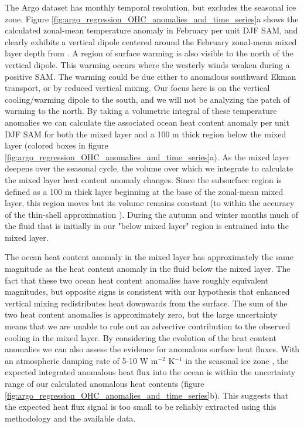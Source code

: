 \documentclass{ametsocV5}
\begin{document}
The Argo dataset has monthly temporal resolution, but excludes the seasonal ice zone. Figure \ref{fig:argo_regression_OHC_anomalies_and_time_series}a shows the calculated zonal-mean temperature anomaly in February per unit DJF SAM, and clearly exhibits a vertical dipole centered around the February zonal-mean mixed layer depth from \citet{Holte2017}. A region of surface warming is also visible to the north of the vertical dipole. This warming occurs where the westerly winds weaken during a positive SAM. The warming could be due either to anomalous southward Ekman transport, or by reduced vertical mixing. Our focus here is on the vertical cooling/warming dipole to the south, and we will not be analyzing the patch of warming to the north. By taking a volumetric integral of these temperature anomalies we can calculate the associated ocean heat content anomaly per unit DJF SAM for both the mixed layer and a 100 m thick region below the mixed layer (colored boxes in figure \ref{fig:argo_regression_OHC_anomalies_and_time_series}a). As the mixed layer deepens over the seasonal cycle, the volume over which we integrate to calculate the mixed layer heat content anomaly changes. Since the subsurface region is defined as a 100 m thick layer beginning at the base of the zonal-mean mixed layer, this region  moves but its volume remains constant (to within the accuracy of the thin-shell approximation \citep{Vallis2006}). During the autumn and winter months much of the fluid that is initially in our "below mixed layer" region is entrained into the mixed layer.


The ocean heat content anomaly in the mixed layer has approximately the same magnitude as the heat content anomaly in the fluid below the mixed layer. The fact that these two ocean heat content anomalies have roughly equivalent magnitudes, but opposite signs is consistent with our hypothesis that enhanced vertical mixing redistributes heat downwards from the surface. The sum of the two heat content anomalies is approximately zero, but the large uncertainty means that we are unable to rule out an advective contribution to the observed cooling in the mixed layer. By considering the evolution of the heat content anomalies we can also assess the evidence for anomalous surface heat fluxes. With an atmospheric damping rate of 5-10 W m$^{-2}$ K$^{-1}$ in the seasonal ice zone \citep{Hausmann2016}, the expected integrated anomalous heat flux into the ocean is within the uncertainty range of our calculated anomalous heat contents (figure \ref{fig:argo_regression_OHC_anomalies_and_time_series}b). This suggests that the expected heat flux signal is too small to be reliably extracted using this methodology and the available data.
\end{document}
